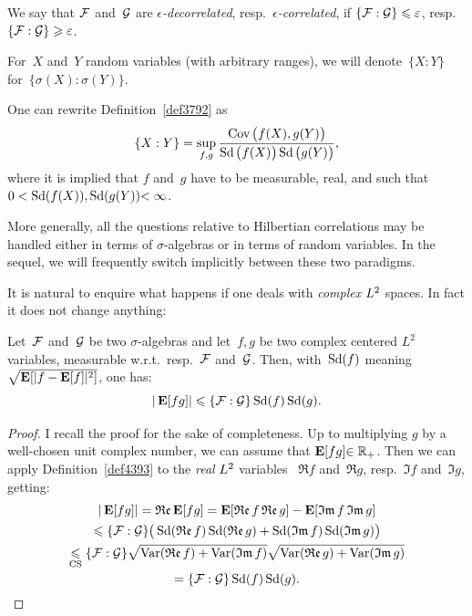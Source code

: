\begin{Def}
We say that $\mathcal{F}$ and~$\mathcal{G}$ are \emph{$\epsilon$-decorrelated},
resp.\ \emph{$\epsilon$-correlated}, if $\{\mathcal{F}:\mathcal{G}\}\leqslant\varepsilon$,
resp.\ $\{\mathcal{F}:\mathcal{G}\} \geqslant \varepsilon$.
\end{Def}

\begin{Def}\label{def3792}
For~$X$ and~$Y$ random variables (with arbitrary ranges), we will denote~${\{X:Y\}}$
for~${\{\sigma(X):\sigma(Y)\}}$.
\end{Def}

\begin{Rmk}
One can rewrite Definition~\ref{def3792} as
\[\label{for3878}
\{ X:Y \} = \sup_{f,g} \frac{\Cov\big( f(X), g(Y) \big)}{\ecty\big(f(X)\big)\ecty\big(g(Y)\big)} ,\]
where it is implied that $f$ and~$g$ have to be measurable, real,
and such that $0 < \operatorname{Sd}(f(X)), \allowbreak \operatorname{Sd}(g(Y)) \allowbreak {< \infty}$.
\end{Rmk}

\begin{NOTA}
More generally, all the questions relative to Hilbertian correlations
may be handled either in terms of $\sigma$-algebras or in terms of random variables.
In the sequel, we will frequently switch implicitly between these two paradigms.
\end{NOTA}

It is natural to enquire what happens if one deals with \emph{complex} $\ldb$ spaces.
In fact it does not change anything:
\begin{Pro}
Let~$\mathcal{F}$ and~$\mathcal{G}$ be two $\sigma$-algebras
and let~$f,g$ be two complex centered $L^2$ variables,
measurable w.r.t.\ resp.~$\mathcal{F}$ and~$\mathcal{G}$.
Then, with~$\operatorname{Sd}(f)$ meaning $\sqrt{\mathop{\smash{\mathbf{E}}}\nolimits[|f-\mathop{\smash{\mathbf{E}}}\nolimits[f]|^2]}$, one has:
\[ |\mathop{\smash{\mathbf{E}}}\nolimits[fg]| \leqslant \{\mathcal{F}:\mathcal{G}\} \operatorname{Sd}(f) \operatorname{Sd}(g) .\]
\end{Pro}
%
\begin{proof}
I recall the proof for the sake of completeness.
Up to multiplying $g$ by a well-chosen unit complex number,
we can assume that $\mathop{\smash{\mathbf{E}}}\nolimits[fg] \allowbreak {\in \mathbb{R}_+}$.
Then we can apply Definition~\ref{def4393} to the \emph{real} $\ldb$ variables%
~$\Re f$ and~$\Re g$, resp.~$\Im f$ and~$\Im g$, getting:
\begin{multline}
|\EE[fg]| = \Re \EE[fg] = \EE[\Re f \Re g] - \EE[\Im f \Im g] \\
\leq \{\mcal{F}:\mcal{G}\} \big( \ecty(\Re f) \ecty(\Re g) + \ecty(\Im f) \ecty(\Im g) \big) \\
\footrel{\text{CS}}{\leq} \{\mcal{F}:\mcal{G}\} \sqrt{\Var(\Re f)+\Var(\Im f)} \sqrt{\Var(\Re g)+\Var(\Im g)} \\
= \{\mcal{F}:\mcal{G}\} \ecty(f) \ecty(g).
\end{multline}
\end{proof}

